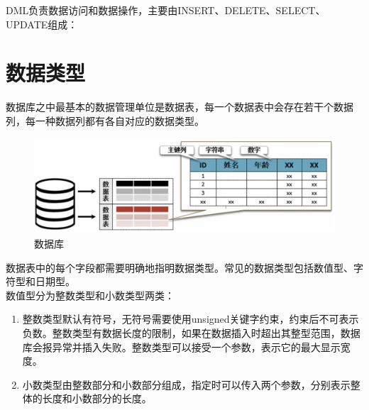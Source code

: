 \documentclass[12pt, openany, oneside]{book}
\begin{document}
DML负责数据访问和数据操作，主要由INSERT、DELETE、SELECT、UPDATE组成：

\begin{table}[H]
    \centering
    \caption{DML指令}
\end{table}

\section{数据类型}

数据库之中最基本的数据管理单位是数据表，每一个数据表中会存在若干个数据列，每一种数据列都有各自对应的数据类型。 \\

\begin{figure}[H]
    \centering
    \includegraphics[]{img/C1/1.png}
    \caption{数据库}
\end{figure}

数据表中的每个字段都需要明确地指明数据类型。常见的数据类型包括数值型、字符型和日期型。 \\

数值型分为整数类型和小数类型两类：

\begin{enumerate}
    \item 整数类型默认有符号，无符号需要使用unsigned关键字约束，约束后不可表示负数。整数类型有数据长度的限制，如果在数据插入时超出其整型范围，数据库会报异常并插入失败。整数类型可以接受一个参数，表示它的最大显示宽度。

    \item 小数类型由整数部分和小数部分组成，指定时可以传入两个参数，分别表示整体的长度和小数部分的长度。
\end{enumerate}
\end{document}
